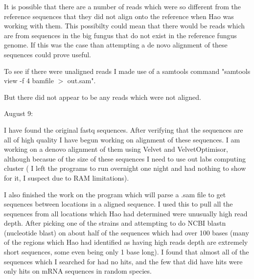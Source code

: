 \documentclass[../main.tex]{subfiles}
\begin{document}
%
%


It is possible that there are a number of reads which were so different from the reference sequences that they did not align onto the reference when Hao was working with them. This possibilty could mean that there would be reads which are from sequences in the big fungus that do not exist in the reference fungus genome. If this was the case than attempting a de novo alignment of these sequences could prove useful. 

To see if there were unaligned reads I made use of a samtools command "samtools view -f 4 bamfile $>$ out.sam". 

But there did not appear to be any reads which were not aligned. 


August 9:

I have found the original fastq sequences. After verifying that the sequences are all of high quality I have begun working on alignment of these sequences. I am working on a denovo alignment of them using Velvet and VelvetOptimisor, although becasue of the size of these sequences I need to use out labs computing cluster ( I left the programs to run overnight one night and had nothing to show for it, I suspect due to RAM limitations). 

I also finished the work on the program which will parse a .sam file to get sequences between locations in a aligned sequence. I used this to pull all the sequences from all locations which Hao had determined were unusually high read depth. After picking one of the strains and attempting to do NCBI blastn (nucleotide blast) on about half of the sequences which had over 100 bases (many of the regions which Hao had identified as having high reads depth are extremely short sequences, some even being only 1 base long). I found that almost all of the sequences which I searched for had no hits, and the few that did have hits were only hits on mRNA sequences in random species.
\end{document}
